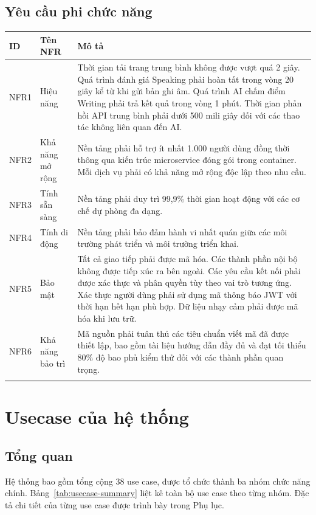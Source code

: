 \subsection{Yêu cầu phi chức năng}

{
\renewcommand{\arraystretch}{1.5} %
\begin{tabularx}{\textwidth}{|l|l|X|}
\hline
\textbf{ID} & \textbf{Tên NFR} & \textbf{Mô tả} \\ \hline
NFR1 & Hiệu năng & Thời gian tải trang trung bình không được vượt quá 2 giây. Quá trình đánh giá Speaking phải hoàn tất trong vòng 20 giây kể từ khi gửi bản ghi âm. Quá trình AI chấm điểm Writing phải trả kết quả trong vòng 1 phút. Thời gian phản hồi API trung bình phải dưới 500 mili giây đối với các thao tác không liên quan đến AI. \\ \hline
NFR2 & Khả năng mở rộng & Nền tảng phải hỗ trợ ít nhất 1.000 người dùng đồng thời thông qua kiến trúc microservice đóng gói trong container. Mỗi dịch vụ phải có khả năng mở rộng độc lập theo nhu cầu. \\ \hline
NFR3 & Tính sẵn sàng & Nền tảng phải duy trì 99,9\% thời gian hoạt động với các cơ chế dự phòng đa dạng. \\ \hline
NFR4 & Tính di động & Nền tảng phải bảo đảm hành vi nhất quán giữa các môi trường phát triển và môi trường triển khai. \\ \hline
NFR5 & Bảo mật & Tất cả giao tiếp phải được mã hóa. Các thành phần nội bộ không được tiếp xúc ra bên ngoài. Các yêu cầu kết nối phải được xác thực và phân quyền tùy theo vai trò tương ứng. Xác thực người dùng phải sử dụng mã thông báo JWT với thời hạn hết hạn phù hợp. Dữ liệu nhạy cảm phải được mã hóa khi lưu trữ. \\ \hline
NFR6 & Khả năng bảo trì & Mã nguồn phải tuân thủ các tiêu chuẩn viết mã đã được thiết lập, bao gồm tài liệu hướng dẫn đầy đủ và đạt tối thiểu 80\% độ bao phủ kiểm thử đối với các thành phần quan trọng. \\ \hline
\caption{Bảng yêu cầu phi chức năng}
\end{tabularx}
}
\section{Usecase của hệ thống}
\subsection{Tổng quan}
Hệ thống bao gồm tổng cộng 38 use case, được tổ chức thành ba nhóm chức năng chính. Bảng~\ref{tab:usecase-summary} liệt kê toàn bộ use case theo từng nhóm. Đặc tả chi tiết của từng use case được trình bày trong Phụ lục.

